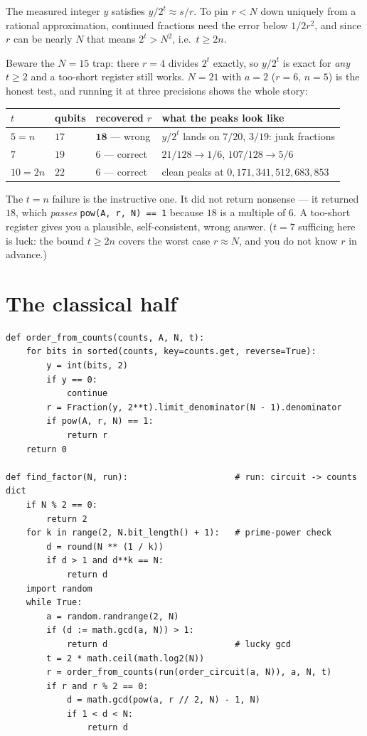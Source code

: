 \documentclass[11pt]{article}
\newcommand{\code}[1]{\texttt{#1}}
\theoremstyle{plain}
\theoremstyle{remark}
\begin{document}
\begin{keybox}[title={Why $t=2n$ --- and what happens if you skimp}]
The measured integer $y$ satisfies $y/2^t\approx s/r$. To pin $r<N$ down uniquely from a rational
approximation, continued fractions need the error below $1/2r^2$, and since $r$ can be nearly $N$
that means $2^t>N^2$, i.e.\ $t\ge2n$.

Beware the $N=15$ trap: there $r=4$ divides $2^t$ exactly, so $y/2^t$ is exact for \emph{any}
$t\ge2$ and a too-short register still works. $N=21$ with $a=2$ ($r=6$, $n=5$) is the honest test,
and running it at three precisions shows the whole story:
\begin{center}\small
\begin{tabular}{@{}lllp{}@{}}
\toprule
$t$ & qubits & recovered $r$ & what the peaks look like\\
\midrule
$5=n$   & $17$ & $\mathbf{18}$ --- wrong & $y/2^t$ lands on $7/20$, $3/19$: junk fractions\\
$7$     & $19$ & $6$ --- correct & $21/128\to1/6$, $107/128\to5/6$\\
$10=2n$ & $22$ & $6$ --- correct & clean peaks at $0,171,341,512,683,853$\\
\bottomrule
\end{tabular}
\end{center}
The $t=n$ failure is the instructive one. It did not return nonsense --- it returned $18$, which
\emph{passes} \code{pow(A, r, N) == 1} because $18$ is a multiple of $6$. A too-short register
gives you a plausible, self-consistent, wrong answer. ($t=7$ sufficing here is luck: the bound
$t\ge2n$ covers the worst case $r\approx N$, and you do not know $r$ in advance.)
\end{keybox}

\section{The classical half}\label{im:sec:classical}

\begin{lstlisting}
def order_from_counts(counts, A, N, t):
    for bits in sorted(counts, key=counts.get, reverse=True):
        y = int(bits, 2)
        if y == 0:
            continue
        r = Fraction(y, 2**t).limit_denominator(N - 1).denominator
        if pow(A, r, N) == 1:
            return r
    return 0

def find_factor(N, run):                     # run: circuit -> counts dict
    if N % 2 == 0:
        return 2
    for k in range(2, N.bit_length() + 1):   # prime-power check
        d = round(N ** (1 / k))
        if d > 1 and d**k == N:
            return d
    import random
    while True:
        a = random.randrange(2, N)
        if (d := math.gcd(a, N)) > 1:
            return d                         # lucky gcd
        t = 2 * math.ceil(math.log2(N))
        r = order_from_counts(run(order_circuit(a, N)), a, N, t)
        if r and r % 2 == 0:
            d = math.gcd(pow(a, r // 2, N) - 1, N)
            if 1 < d < N:
                return d
\end{lstlisting}
\end{document}
